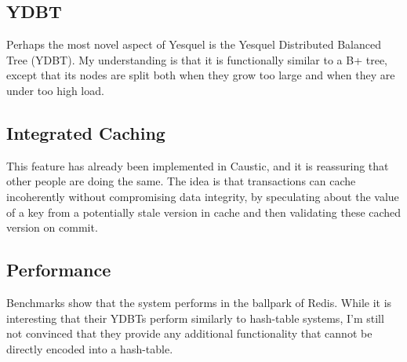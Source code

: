 \documentclass[journal]{../styles/IEEEtran}
\begin{document}
  \subsection{YDBT}
  Perhaps the most novel aspect of Yesquel is the Yesquel Distributed Balanced Tree (YDBT). My
  understanding is that it is functionally similar to a B+ tree, except that its nodes are split
  both when they grow too large and when they are under too high load.

  \subsection{Integrated Caching}
  This feature has already been implemented in Caustic, and it is reassuring that other people are
  doing the same. The idea is that transactions can cache incoherently without compromising data
  integrity, by speculating about the value of a key from a potentially stale version in cache and
  then validating these cached version on commit.
  
  \subsection{Performance}
  Benchmarks show that the system performs in the ballpark of Redis. While it is interesting that 
  their YDBTs perform similarly to hash-table systems, I'm still not convinced that they provide any
  additional functionality that cannot be directly encoded into a hash-table.
\end{document}
